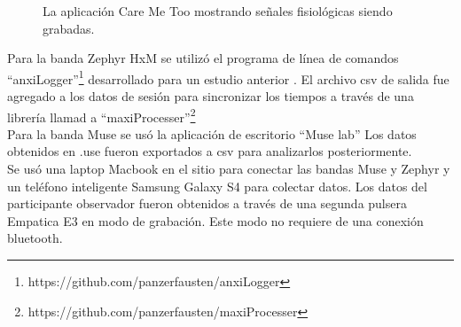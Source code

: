 \begin{figure}[h]
        \centering
        \caption{La aplicaci\'on Care Me Too mostrando se\~nales fisiol\'ogicas siendo grabadas.}\label{fig:caremetoo}
\end{figure}

Para la banda Zephyr HxM se utiliz\'o el programa de l\'inea de comandos ``anxiLogger''\footnote{https://github.com/panzerfausten/anxiLogger} desarrollado para un estudio anterior \citep{Miranda}. El archivo csv de salida fue agregado a los datos de sesi\'on para sincronizar los tiempos a trav\'es de una librer\'ia llamad a ``maxiProcesser''\footnote{https://github.com/panzerfausten/maxiProcesser}
\\
Para la banda Muse se us\'o la aplicaci\'on de escritorio ``Muse lab'' Los datos obtenidos en .use fueron exportados a csv para analizarlos posteriormente.
\\
Se us\'o una laptop Macbook en el sitio para conectar las bandas Muse y Zephyr y un tel\'efono inteligente Samsung Galaxy S4 para colectar datos. Los datos del participante observador fueron obtenidos a trav\'es de una segunda pulsera Empatica E3 en modo de grabaci\'on. Este modo no requiere de una conexi\'on bluetooth.

